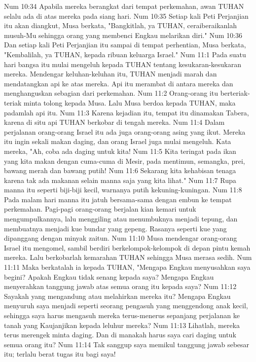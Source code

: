Num 10:34  Apabila mereka berangkat dari tempat perkemahan, awan TUHAN selalu ada di atas mereka pada siang hari.
Num 10:35  Setiap kali Peti Perjanjian itu akan diangkut, Musa berkata, "Bangkitlah, ya TUHAN, ceraiberaikanlah musuh-Mu sehingga orang yang membenci Engkau melarikan diri."
Num 10:36  Dan setiap kali Peti Perjanjian itu sampai di tempat perhentian, Musa berkata, "Kembalilah, ya TUHAN, kepada ribuan keluarga Israel."
Num 11:1  Pada suatu hari bangsa itu mulai mengeluh kepada TUHAN tentang kesukaran-kesukaran mereka. Mendengar keluhan-keluhan itu, TUHAN menjadi marah dan mendatangkan api ke atas mereka. Api itu merambat di antara mereka dan menghanguskan sebagian dari perkemahan.
Num 11:2  Orang-orang itu berteriak-teriak minta tolong kepada Musa. Lalu Musa berdoa kepada TUHAN, maka padamlah api itu.
Num 11:3  Karena kejadian itu, tempat itu dinamakan Tabera, karena di situ api TUHAN berkobar di tengah mereka.
Num 11:4  Dalam perjalanan orang-orang Israel itu ada juga orang-orang asing yang ikut. Mereka itu ingin sekali makan daging, dan orang Israel juga mulai mengeluh. Kata mereka, "Ah, coba ada daging untuk kita!
Num 11:5  Kita teringat pada ikan yang kita makan dengan cuma-cuma di Mesir, pada mentimun, semangka, prei, bawang merah dan bawang putih!
Num 11:6  Sekarang kita kehabisan tenaga karena tak ada makanan selain manna saja yang kita lihat."
Num 11:7  Rupa manna itu seperti biji-biji kecil, warnanya putih kekuning-kuningan.
Num 11:8  Pada malam hari manna itu jatuh bersama-sama dengan embun ke tempat perkemahan. Pagi-pagi orang-orang berjalan kian kemari untuk mengumpulkannya, lalu menggiling atau menumbuknya menjadi tepung, dan membuatnya menjadi kue bundar yang gepeng. Rasanya seperti kue yang dipanggang dengan minyak zaitun.
Num 11:10  Musa mendengar orang-orang Israel itu mengomel, sambil berdiri berkelompok-kelompok di depan pintu kemah mereka. Lalu berkobarlah kemarahan TUHAN sehingga Musa merasa sedih.
Num 11:11  Maka berkatalah ia kepada TUHAN, "Mengapa Engkau menyusahkan saya begini? Apakah Engkau tidak senang kepada saya? Mengapa Engkau menyerahkan tanggung jawab atas semua orang itu kepada saya?
Num 11:12  Sayakah yang mengandung atau melahirkan mereka itu? Mengapa Engkau menyuruh saya menjadi seperti seorang pengasuh yang menggendong anak kecil, sehingga saya harus mengasuh mereka terus-menerus sepanjang perjalanan ke tanah yang Kaujanjikan kepada leluhur mereka?
Num 11:13  Lihatlah, mereka terus merengek minta daging. Dan di manakah harus saya cari daging untuk semua orang itu?
Num 11:14  Tak sanggup saya memikul tanggung jawab sebesar itu; terlalu berat tugas itu bagi saya!
